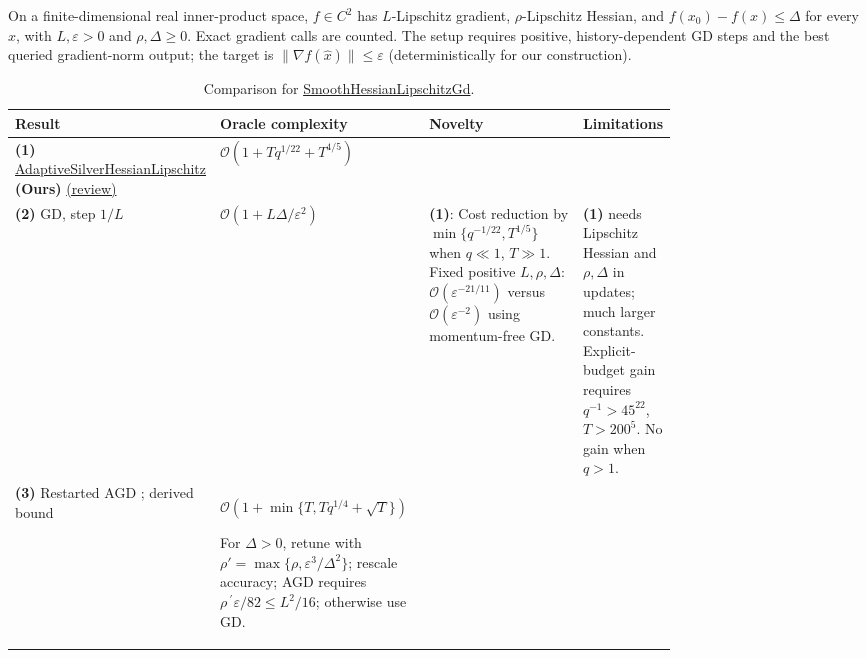 \begin{table}[tp]
\centering
\caption{Comparison for \href{https://github.com/k3nfalt/longtails/blob/main/LongTails/Setups/SmoothHessianLipschitzGd.lean}{SmoothHessianLipschitzGd}.}\label{tab:SmoothHessianLipschitzGd}
\parbox{\linewidth}{\footnotesize On a finite-dimensional real inner-product space, $f\in C^2$ has $L$-Lipschitz gradient, $\rho$-Lipschitz Hessian, and $f(x_0)-f(x)\leq\Delta$ for every $x$, with $L,\varepsilon>0$ and $\rho,\Delta\geq0$. Exact gradient calls are counted. The setup requires positive, history-dependent GD steps and the best queried gradient-norm output; the target is $\|\nabla f(\hat x)\|\leq\varepsilon$ (deterministically for our construction).}\par\smallskip
\begin{threeparttable}
\footnotesize
\setlength{\tabcolsep}{4pt}\renewcommand{\arraystretch}{1.25}
\begin{tabularx}{\linewidth}{@{}>{\raggedright\arraybackslash}p{0.20\linewidth}>{\raggedright\arraybackslash}p{0.32\linewidth}>{\raggedright\arraybackslash}p{0.25\linewidth}>{\raggedright\arraybackslash}X@{}}
\toprule
\textbf{Result} & \textbf{Oracle complexity} & \textbf{Novelty} & \textbf{Limitations} \\
\midrule
\textbf{(1)} \href{https://github.com/k3nfalt/longtails/blob/main/LongTails/Theorems/AdaptiveSilverHessianLipschitz.lean}{Adaptive\allowbreak Silver\allowbreak Hessian\allowbreak Lipschitz} \textbf{(Ours)} \href{https://github.com/k3nfalt/longtails/blob/main/scripts/reviews/AdaptiveSilverHessianLipschitz.md}{(review)}
& $\mathcal{O}(1+Tq^{1/22}+T^{4/5})$ & & \\
\midrule[1.2pt]
\textbf{(2)} GD, step $1/L$ \citep[\S1.2.3]{hlgsNesterov2018}
& $\mathcal{O}(1+L\Delta/\varepsilon^2)$
& \textbf{(1)}: Cost reduction by $\min\{q^{-1/22},T^{1/5}\}$ when $q\ll1$, $T\gg1$. Fixed positive $L,\rho,\Delta$: $\mathcal{O}(\varepsilon^{-21/11})$ versus $\mathcal{O}(\varepsilon^{-2})$ using momentum-free GD.
& \textbf{(1)} needs Lipschitz Hessian and $\rho,\Delta$ in updates; much larger constants. Explicit-budget gain requires $q^{-1}>45^{22}$, $T>200^5$. No gain when $q>1$. \\
\midrule
\textbf{(3)} Restarted AGD \citep[Thm.~1, v4]{shlgLiLinV4}; derived bound
& $\mathcal{O}\!\left(1+\min\{T,Tq^{1/4}+\sqrt T\}\right)$\par For $\Delta>0$, retune with $\rho'=\max\{\rho,\varepsilon^3/\Delta^2\}$; rescale accuracy; AGD requires $\rho\,{}^{\prime}\varepsilon/82\leq L^2/16$; otherwise use GD.

\end{tabularx}
\end{threeparttable}
\end{table}
